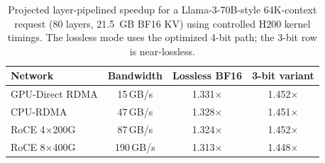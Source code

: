 \begin{table}[t]
\centering
\small
\caption{Projected layer-pipelined speedup for a Llama-3-70B-style 64K-context request (80 layers, 21.5~GB BF16 KV) using controlled H200 kernel timings. The lossless mode uses the optimized 4-bit path; the 3-bit row is near-lossless.}
\label{tab:pipeline}
\begin{tabular}{lccc}
\toprule
Network & Bandwidth & Lossless BF16 & 3-bit variant \\
\midrule
GPU-Direct RDMA & 15\,GB/s & 1.331$\times$ & 1.452$\times$ \\
CPU-RDMA & 47\,GB/s & 1.328$\times$ & 1.451$\times$ \\
RoCE 4$\times$200G & 87\,GB/s & 1.324$\times$ & 1.452$\times$ \\
RoCE 8$\times$400G & 190\,GB/s & 1.313$\times$ & 1.448$\times$ \\
\bottomrule
\end{tabular}
\end{table}

